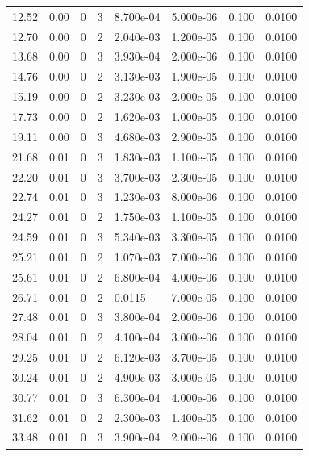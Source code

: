 \documentclass[preview]{standalone}
\begin{document}
{{\begin{tabular}{L{1.2cm}C{1.2cm} C{0.3cm}C{0.5cm} C{1.4cm}C{1.4cm} C{1.4cm}C{1.4cm}}
  12.52  &  0.00  & 0     &  3 &  8.700e-04  & 5.000e-06  & 0.100 &  0.0100   \\ 
  12.70  &  0.00  & 0     &  2 &  2.040e-03  & 1.200e-05  & 0.100 &  0.0100   \\ 
  13.68  &  0.00  & 0     &  3 &  3.930e-04  & 2.000e-06  & 0.100 &  0.0100   \\ 
  14.76  &  0.00  & 0     &  2 &  3.130e-03  & 1.900e-05  & 0.100 &  0.0100   \\ 
  15.19  &  0.00  & 0     &  2 &  3.230e-03  & 2.000e-05  & 0.100 &  0.0100   \\ 
  17.73  &  0.00  & 0     &  2 &  1.620e-03  & 1.000e-05  & 0.100 &  0.0100   \\ 
  19.11  &  0.00  & 0     &  3 &  4.680e-03  & 2.900e-05  & 0.100 &  0.0100   \\ 
  21.68  &  0.01  & 0     &  3 &  1.830e-03  & 1.100e-05  & 0.100 &  0.0100   \\ 
  22.20  &  0.01  & 0     &  3 &  3.700e-03  & 2.300e-05  & 0.100 &  0.0100   \\ 
  22.74  &  0.01  & 0     &  3 &  1.230e-03  & 8.000e-06  & 0.100 &  0.0100   \\ 
  24.27  &  0.01  & 0     &  2 &  1.750e-03  & 1.100e-05  & 0.100 &  0.0100   \\ 
  24.59  &  0.01  & 0     &  3 &  5.340e-03  & 3.300e-05  & 0.100 &  0.0100   \\ 
  25.21  &  0.01  & 0     &  2 &  1.070e-03  & 7.000e-06  & 0.100 &  0.0100   \\ 
  25.61  &  0.01  & 0     &  2 &  6.800e-04  & 4.000e-06  & 0.100 &  0.0100   \\ 
  26.71  &  0.01  & 0     &  2 &  0.0115  & 7.000e-05  & 0.100 &  0.0100   \\ 
  27.48  &  0.01  & 0     &  3 &  3.800e-04  & 2.000e-06  & 0.100 &  0.0100   \\ 
  28.04  &  0.01  & 0     &  2 &  4.100e-04  & 3.000e-06  & 0.100 &  0.0100   \\ 
  29.25  &  0.01  & 0     &  2 &  6.120e-03  & 3.700e-05  & 0.100 &  0.0100   \\ 
  30.24  &  0.01  & 0     &  2 &  4.900e-03  & 3.000e-05  & 0.100 &  0.0100   \\ 
  30.77  &  0.01  & 0     &  3 &  6.300e-04  & 4.000e-06  & 0.100 &  0.0100   \\ 
  31.62  &  0.01  & 0     &  2 &  2.300e-03  & 1.400e-05  & 0.100 &  0.0100   \\ 
  33.48  &  0.01  & 0     &  3 &  3.900e-04  & 2.000e-06  & 0.100 &  0.0100   \\ 

\end{tabular}}}
\end{document}
